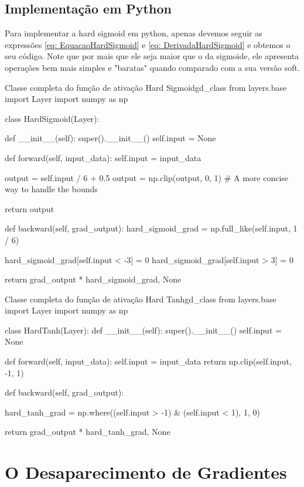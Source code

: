 \subsection{Implementação em Python}

Para implementar a hard sigmoid em python, apenas devemos seguir as expressões \ref{eq: EquacaoHardSigmoid} e \ref{eq: DerivadaHardSigmoid} e obtemos o seu código. Note que por mais que ele seja maior que o da sigmoide, ele apresenta operações bem mais simples e "baratas" quando comparado com a sua versão soft.

\begin{codelisting}{Classe completa do função de ativação Hard Sigmoid}{gd_class}
from layers.base import Layer
import numpy as np

class HardSigmoid(Layer):

    def __init__(self):
        super().__init__()
        self.input = None

    def forward(self, input_data):
        self.input = input_data

        output = self.input / 6 + 0.5
        output = np.clip(output, 0, 1)  # A more concise way to handle the bounds

        return output

    def backward(self, grad_output):
        hard_sigmoid_grad = np.full_like(self.input, 1 / 6)

        hard_sigmoid_grad[self.input < -3] = 0
        hard_sigmoid_grad[self.input > 3] = 0

        return grad_output * hard_sigmoid_grad, None
\end{codelisting}

\begin{codelisting}{Classe completa do função de ativação Hard Tanh}{gd_class}
from layers.base import Layer
import numpy as np


class HardTanh(Layer):
    def __init__(self):
        super().__init__()
        self.input = None

    def forward(self, input_data):
        self.input = input_data
        return np.clip(self.input, -1, 1)

    def backward(self, grad_output):

        hard_tanh_grad = np.where((self.input > -1) & (self.input < 1), 1, 0)

        return grad_output * hard_tanh_grad, None
\end{codelisting}

\section{O Desaparecimento de Gradientes}

